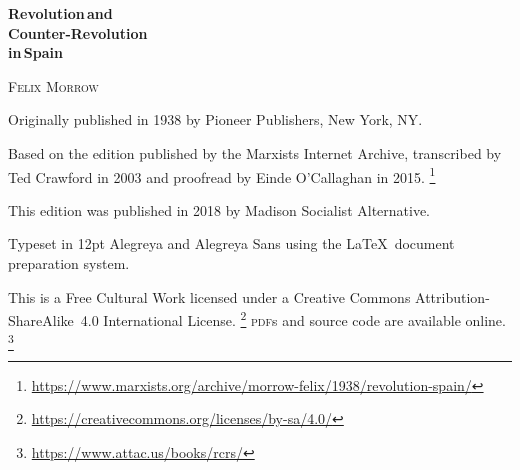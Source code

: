 \begin{titlepage}
	\setlength{\parindent}{0pt}
	
	\vspace*{\fill}
	
	{\sffamily\bfseries\fontsize{40}{40}\selectfont
		Revolution\,\textmd{and} \\
		Counter-Revolution \\
		\textmd{in}\,Spain
		\par}
	
	\vspace{60pt}
	
	{\fontsize{20}{20}\selectfont
		\textsc{Felix Morrow}
		\par}
	
	\vspace*{\fill}
	
\end{titlepage}

{
	\thispagestyle{empty}
	\setlength{\parindent}{0em}
	\setlength{\parskip}{0.5em}
	\sloppy
	\raggedright
	
	\vspace*{\fill}
	\vspace*{\fill}
	
	Originally published in 1938 by Pioneer Publishers, New York, NY.
	
	Based on the edition published by the Marxists Internet Archive, transcribed by Ted Crawford in 2003 and proofread by Einde O’Cal\-la\-ghan in 2015.%
	\footnote{\href{https://www.marxists.org/archive/morrow-felix/1938/revolution-spain/}{https://www.marxists.org/archive/morrow-felix/1938/revolution-spain/}}
	
	This edition was published in 2018 by Madison Socialist Alternative.
	
	Typeset in 12pt Alegreya and {\sffamily Alegreya Sans} using the \LaTeX\ document preparation system.
	
	This is a Free Cultural Work licensed under a Creative Commons Attribution-ShareAlike~4.0 International License.%
	\footnote{\href{https://creativecommons.org/licenses/by-sa/4.0/}{https://creativecommons.org/licenses/by-sa/4.0/}}
	\textsc{pdf}s and source code are available online.%
	\footnote{\href{https://www.attac.us/books/rcrs/}{https://www.attac.us/books/rcrs/}}
	
	\vspace*{\fill}
}